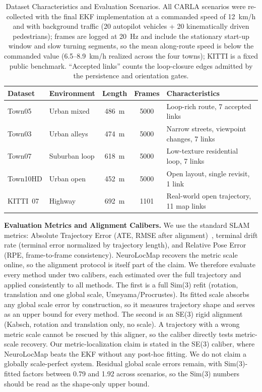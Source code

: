\begin{table}[!t]
    \centering
    \setlength{\tabcolsep}{2.8pt} %
    \footnotesize
    \caption{Dataset Characteristics and Evaluation Scenarios. All CARLA scenarios were re-collected with the final EKF implementation at a commanded speed of 12~km/h and with background traffic (20 autopilot vehicles + 20 kinematically driven pedestrians); frames are logged at 20~Hz and include the stationary start-up window and slow turning segments, so the mean along-route speed is below the commanded value (6.5--8.9~km/h realized across the four towns); KITTI is a fixed public benchmark. ``Accepted links'' counts the loop-closure edges admitted by the persistence and orientation gates.}
    \label{tab:datasets}
    \begin{tabular}{@{}llccl@{}}
        \toprule
        Dataset  & Environment & Length & Frames & Characteristics                    \\
        \midrule
        Town05   & Urban mixed & 486~m  & 5000   & Loop-rich route, 7 accepted links  \\
        Town03   & Urban alleys& 474~m  & 5000   & Narrow streets, viewpoint changes, 7 links \\
        Town07   & Suburban loop& 618~m & 5000   & Low-texture residential loop, 7 links \\
        Town10HD & Urban open  & 452~m  & 5000   & Open layout, single revisit, 1 link \\
        KITTI~07 & Highway     & 692~m  & 1101   & Real-world open trajectory, 11 map links \\
        \bottomrule
    \end{tabular}
\end{table}

\textbf{Evaluation Metrics and Alignment Calibers.} We use the standard SLAM metrics: Absolute Trajectory Error (ATE, RMSE after alignment)~\cite{sturm2012benchmark}, terminal drift rate (terminal error normalized by trajectory length), and Relative Pose Error (RPE, frame-to-frame consistency). NeuroLocMap recovers the metric scale online, so the alignment protocol is itself part of the claim. We therefore evaluate every method under two calibers, each estimated over the full trajectory and applied consistently to all methods. The first is a full Sim(3) refit (rotation, translation and one global scale, Umeyama/Procrustes). Its fitted scale absorbs any global scale error by construction, so it measures trajectory shape and serves as an upper bound for every method. The second is an SE(3) rigid alignment (Kabsch, rotation and translation only, no scale). A trajectory with a wrong metric scale cannot be rescued by this aligner, so the caliber directly tests metric-scale recovery. Our metric-localization claim is stated in the SE(3) caliber, where NeuroLocMap beats the EKF without any post-hoc fitting. We do not claim a globally scale-perfect system. Residual global scale errors remain, with Sim(3)-fitted factors between 0.79 and 1.92 across scenarios, so the Sim(3) numbers should be read as the shape-only upper bound.

